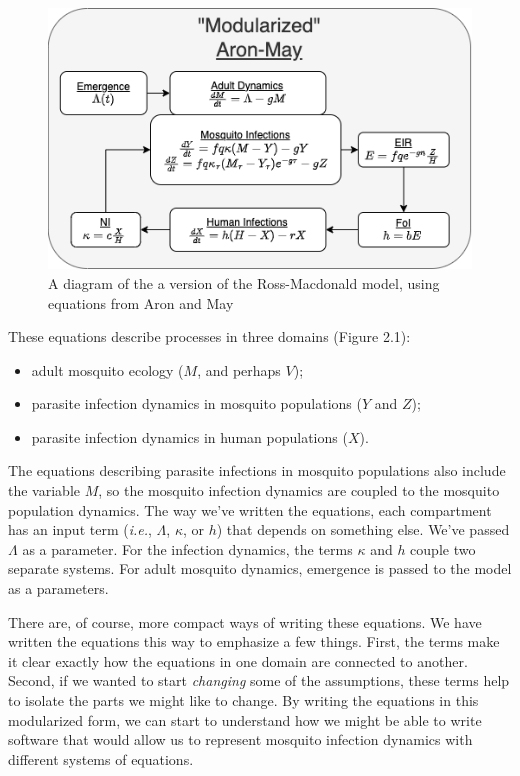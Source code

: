 \documentclass[
]{book}
\begin{document}
\begin{figure}
\centering
\includegraphics{Figures/AronMay.png}
\caption{A diagram of the a version of the Ross-Macdonald model, using equations from Aron and May \autocite{AronJL1982PopulationDynamics}}
\end{figure}

These equations describe processes in three domains (Figure 2.1):

\begin{itemize}
\item
  adult mosquito ecology (\(M\), and perhaps \(V\));
\item
  parasite infection dynamics in mosquito populations (\(Y\) and \(Z\));
\item
  parasite infection dynamics in human populations (\(X\)).
\end{itemize}

The equations describing parasite infections in mosquito populations also include the variable \(M\), so the mosquito infection dynamics are coupled to the mosquito population dynamics. The way we've written the equations, each compartment has an input term (\emph{i.e.}, \(\Lambda\), \(\kappa\), or \(h\)) that depends on something else. We've passed \(\Lambda\) as a parameter. For the infection dynamics, the terms \(\kappa\) and \(h\) couple two separate systems. For adult mosquito dynamics, emergence is passed to the model as a parameters.

There are, of course, more compact ways of writing these equations. We have written the equations this way to emphasize a few things. First, the terms make it clear exactly how the equations in one domain are connected to another. Second, if we wanted to start \emph{changing} some of the assumptions, these terms help to isolate the parts we might like to change. By writing the equations in this modularized form, we can start to understand how we might be able to write software that would allow us to represent mosquito infection dynamics with different systems of equations.
\end{document}
